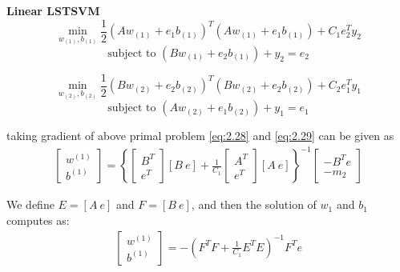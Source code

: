 \documentclass[12pt,a4paper,oneside,english]{report}
\begin{document}
\textbf{Linear LSTSVM}\\

\begin{equation} \label{eq:2.28}
    \min_{w_{(1)} , b_{(1)}} \frac{1}{2} ( 
            Aw_{(1)} + e_1 b_{(1)} )^T
            ( Aw_{(1)} + e_1b_{(1)} ) + C_1 e_2^Ty_2
\end{equation}
\vspace{-2em}
\begin{equation*}
    \text{subject to } (Bw_{(1)} + e_2 b_{(1)}) + y_2 = e_2
\end{equation*}

\begin{equation}  \label{eq:2.29}
    \min_{w_{(2)} , b_{(2)}} \frac{1}{2} ( 
            Bw_{(2)} + e_2 b_{(2)} )^T
            ( Bw_{(2)} + e_2b_{(2)} ) + C_2 e_1^Ty_1
\end{equation}
\vspace{-2em}
\begin{equation*}
    \text{subject to } (Aw_{(2)} + e_1 b_{(2)}) + y_1 = e_1
\end{equation*}

taking gradient of above primal problem \ref{eq:2.28} and \ref{eq:2.29} can be given as \\
\begin{align}
\begin{bmatrix}
w^{(1)} \\
b^{(1)}
\end{bmatrix}
= 
\left\lbrace
\begin{bmatrix}
B^T \\
e^T
\end{bmatrix}
[B \ e] + \frac{1}{C_1}
\begin{bmatrix}
A^T \\
e^T
\end{bmatrix}
[A \ e]
\right\rbrace^{-1}
\begin{bmatrix}
-B^T e \\
-m_2
\end{bmatrix}
\end{align}


We define \( E = [A \ e] \) and \( F = [B \ e] \), and then the solution of \( w_1 \) and \( b_1 \) computes as:
\begin{align}
\begin{bmatrix}
w^{(1)} \\
b^{(1)}
\end{bmatrix}
= - \left( F^T F + \frac{1}{C_1} E^T E \right)^{-1} F^T e
\end{align}
\end{document}
